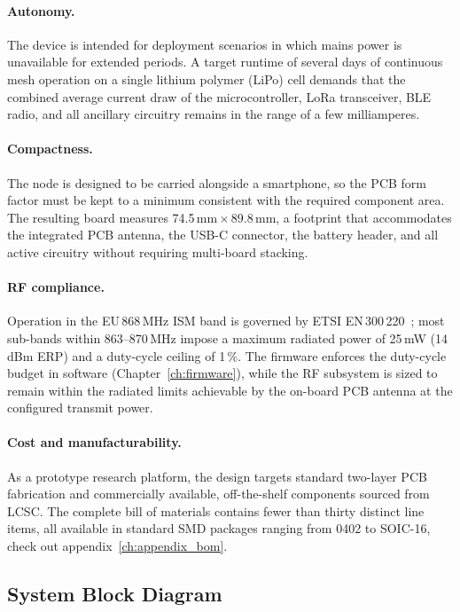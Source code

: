 \documentclass[english,bachelor]{tfgitic}[2026/01/22]
\begin{document}
\paragraph{Autonomy.}
The device is intended for deployment scenarios in which mains power is unavailable
for extended periods. A target runtime of several days of continuous mesh operation
on a single lithium polymer (LiPo) cell demands that the combined average current
draw of the microcontroller, LoRa transceiver, BLE radio, and all ancillary
circuitry remains in the range of a few milliamperes.

\paragraph{Compactness.}
The node is designed to be carried alongside a smartphone, so the PCB form factor
must be kept to a minimum consistent with the required component area. The resulting
board measures 74.5\,mm\,$\times$\,89.8\,mm, a footprint that accommodates the
integrated PCB antenna, the USB-C connector, the battery header, and all active
circuitry without requiring multi-board stacking.

\paragraph{RF compliance.}
Operation in the EU\,868\,MHz ISM band is governed by ETSI EN\,300\,220~\cite{etsi2020en300220};
most sub-bands within 863--870\,MHz impose a maximum radiated power of 25\,mW
(14\,dBm ERP) and a duty-cycle ceiling of 1\,\%. The firmware enforces the
duty-cycle budget in software (Chapter~\ref{ch:firmware}), while the RF subsystem
is sized to remain within the radiated limits achievable by the on-board PCB antenna
at the configured transmit power.

\paragraph{Cost and manufacturability.}
As a prototype research platform, the design targets standard two-layer PCB
fabrication and commercially available, off-the-shelf components sourced from LCSC.
The complete bill of materials contains fewer than thirty distinct line
items, all available in standard SMD packages ranging from 0402 to SOIC-16, check out appendix~\ref{ch:appendix_bom}.


\subsection{System Block Diagram}
\label{sec:hw_block}
\end{document}
